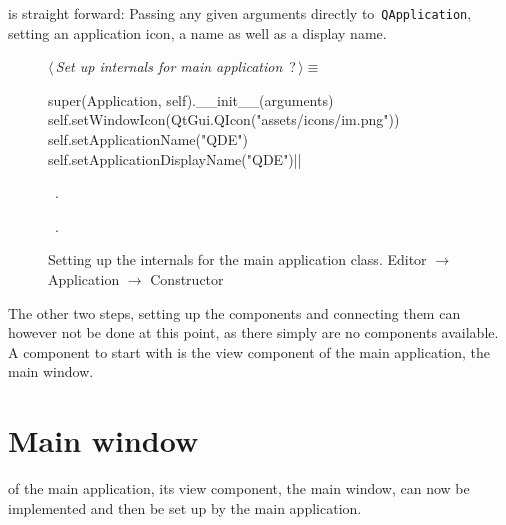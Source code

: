 \documentclass[%
    a4paper,    %
    justified,  %
    nobib,      %
    openany     %
]{tufte-book}
\begin{document}
 is straight forward: Passing any given
arguments directly to~\verb=QApplication=, setting an application icon, a name
as well as a display name.

\begin{figure}[h]
\begin{flushleft} \small
\begin{minipage}{\linewidth}\label{scrap14}\raggedright\small
{} $\langle\,${\itshape Set up internals for main application}\nobreak\ {\footnotesize {?}}$\,\rangle\equiv$
\vspace{-1ex}
\begin{pythoncode}
super(Application, self).__init__(arguments)
self.setWindowIcon(QtGui.QIcon("assets/icons/im.png"))
self.setApplicationName("QDE")
self.setApplicationDisplayName("QDE")|\NWsep|
\end{pythoncode}
\vspace{1.5ex}
\footnotesize
\begin{list}{}{\setlength{\itemsep}{-\parsep}\setlength{\itemindent}{-\leftmargin}}
\item \NWtxtMacroDefBy\ .
\item \NWtxtMacroRefIn\ .

\item{}
\end{list}
\end{minipage}\vspace{4ex}
\end{flushleft}
\caption{Setting up the internals for the main application class.
  \newline{}\newline{}Editor $\rightarrow$ Application $\rightarrow$
  Constructor} \label{editor:lst:app:constructor:internals}
\end{figure}

The other two steps, setting up the components and connecting them can however
not be done at this point, as there simply are no components available. A
component to start with is the view component of the main application, the main
window.

\section{Main window}
\label{appendix:sec:editor:main-window}

 of the main application, its
view component, the main window, can now be implemented and then be set up by
the main application.
\end{document}
